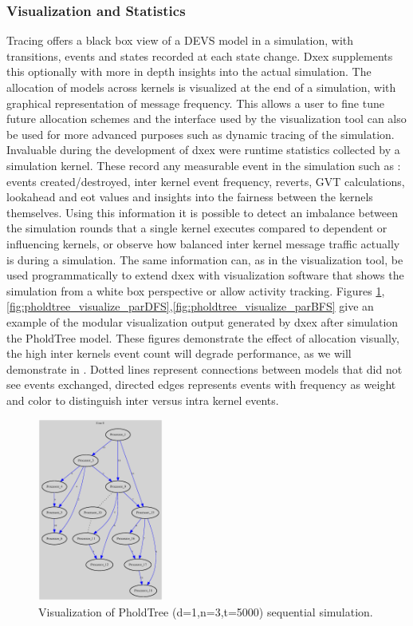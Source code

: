 \subsubsection{Visualization and Statistics}
Tracing offers a black box view of a DEVS model in a simulation, with transitions, events and states recorded at each state change. Dxex supplements this optionally with more in depth insights into the actual simulation. The allocation of models across kernels is visualized at the end of a simulation, with graphical representation of message frequency. This allows a user to fine tune future allocation schemes and the interface used by the visualization tool can also be used for more advanced purposes such as dynamic tracing of the simulation.\\
Invaluable during the development of dxex were runtime statistics collected by a simulation kernel. These record any measurable event in the simulation such as : events created/destroyed, inter kernel event frequency, reverts, GVT calculations, lookahead and eot values and insights into the fairness between the kernels themselves. Using this information it is possible to detect an imbalance between the simulation rounds that a single kernel executes compared to dependent or influencing kernels, or observe how balanced inter kernel message traffic actually is during a simulation. The same information can, as in the visualization tool, be used programmatically to extend dxex with visualization software that shows the simulation from a white box perspective or allow activity tracking.
Figures \ref{fig:pholdtree_visualize_seq},\ref{fig:pholdtree_visualize_parDFS},\ref{fig:pholdtree_visualize_parBFS} give an example of the modular visualization output generated by dxex after simulation the PholdTree model. These figures demonstrate the effect of allocation visually, the high inter kernels event count will degrade performance, as we will demonstrate in 
 . Dotted lines represent connections between models that did not see events exchanged, directed edges represents events with frequency as weight and color to distinguish inter versus intra kernel events.
\begin{figure}
	\center
	\includegraphics[width=\plotfraction\columnwidth, height=6cm, keepaspectratio]{fig/pholdtreed1n3t5000.eps}
	\caption{Visualization of PholdTree (d=1,n=3,t=5000) sequential simulation.}
	\label{fig:pholdtree_visualize_seq}
\end{figure}
